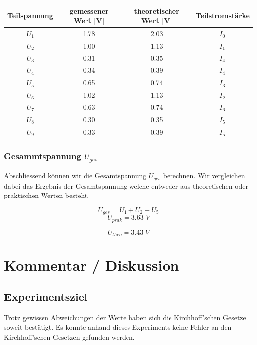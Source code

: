 \documentclass[a4paper,12pt]{article}
\begin{document}
\begin{table}[H]
\centering
    \begin{tabular}{|c|c|c|c|}
        \hline
        \textbf{Teilspannung} & \textbf{gemessener Wert [V]} & \textbf{theoretischer Wert [V]} & \textbf{Teilstromstärke}\\
        \hline
        $U_1$ & 1.78 & 2.03 & $I_0$\\
        \hline
        $U_2$ & 1.00 & 1.13 & $I_1$\\
        \hline
        $U_3$ & 0.31 & 0.35 & $I_4$\\
        \hline
        $U_4$ & 0.34 & 0.39 & $I_4$\\
        \hline
        $U_5$ & 0.65 & 0.74 & $I_3$\\
        \hline
        $U_6$ & 1.02 & 1.13 & $I_2$\\
        \hline
        $U_7$ & 0.63 & 0.74 & $I_6$\\
        \hline
        $U_8$ & 0.30 & 0.35 & $I_5$\\
        \hline
        $U_9$ & 0.33 & 0.39 & $I_5$\\
        \hline
    \end{tabular}
\end{table}

\subsubsection{Gesammtspannung $U_{ges}$}

Abschliessend können wir die Gesamtspannung $U_{ges}$ berechnen. Wir vergleichen dabei das Ergebnis der Gesamtspannung welche entweder aus theoretischen oder praktischen Werten besteht.

$$U_{ges} = U_1 + U_2 + U_5$$
$$U_{prak} = 3.63\; V$$

$$U_{theo} = 3.43\; V$$

\section{Kommentar / Diskussion}

\subsection{Experimentsziel}

Trotz gewissen Abweichungen der Werte haben sich die Kirchhoff'schen Gesetze soweit bestätigt. Es konnte anhand dieses Experiments keine Fehler an den Kirchhoff'schen Gesetzen gefunden werden.
\end{document}

